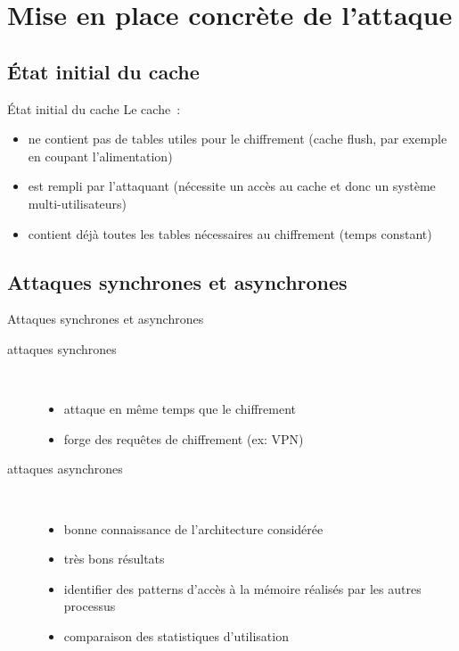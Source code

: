 \documentclass[11pt]{beamer}
\begin{document}
\section{Mise en place concrète de l'attaque}

\subsection{État initial du cache} 
\begin{frame}{État initial du cache}
Le cache~\cite{canteaut2006understanding}:
\begin{itemize}
\item ne contient pas de tables utiles pour le chiffrement (cache flush, par exemple en coupant l'alimentation)
\item est rempli par l'attaquant (nécessite un accès au cache et donc un système multi-utilisateurs) 
\item contient déjà toutes les tables nécessaires au chiffrement (temps constant)
\end{itemize}
\end{frame}

\subsection{Attaques synchrones et asynchrones}
\begin{frame}{Attaques synchrones et asynchrones~\cite{osvik2006cache}}


\begin{description}
\item [attaques synchrones]~\\ 
\begin{itemize}
\item attaque en même temps que le chiffrement
\item forge des requêtes de chiffrement (ex: VPN)
\end{itemize}
\item [attaques asynchrones] ~\\
\begin{itemize}
\item bonne connaissance de l'architecture considérée
\item très bons résultats
\item identifier des patterns d'accès à la mémoire réalisés par les autres processus
\item comparaison des statistiques d'utilisation
\end{itemize}
\end{description}

\end{frame}
\end{document}
